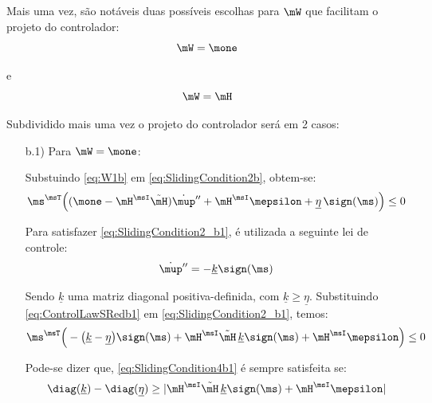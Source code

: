 \documentclass[]{politex}
\begin{document}
\begin{itemize}
Mais uma vez, são notáveis duas possíveis escolhas para $\mW$ que facilitam o projeto do controlador:
\begin{equation} \label{eq:W1b}
\mW = \mone
\end{equation}

e
\begin{equation} \label{eq:W2b}
\mW = \mH
\end{equation}

Subdividido mais uma vez o projeto do controlador será  em 2 casos:

\begin{itemize}
\item[b.1)] Para $\mW = \mone$:


Substuindo \eqref{eq:W1b} em \eqref{eq:SlidingCondition2b}, obtem-se:
\begin{equation} \label{eq:SlidingCondition2_b1}
\ms^\msT \Big((\mone - \mH^\msI \tilde{\mH} )\dot{\mup}'' + \mH^\msI \mepsilon + \underline{\eta} \, \sign(\ms) \Big) \leq 0
\end{equation}

Para satisfazer \eqref{eq:SlidingCondition2_b1}, é utilizada a seguinte lei de controle:
\begin{equation} \label{eq:ControlLawSRedb1}
\dot{\mup}'' =  -\underline{k} \sign(\ms)
\end{equation}

Sendo $\underline{k}$ uma matriz diagonal positiva-definida, com $\underline{k} \geq \underline{\eta} $. Substituindo \eqref{eq:ControlLawSRedb1} em \eqref{eq:SlidingCondition2_b1}, temos:
\begin{equation} \label{eq:SlidingCondition4b1}
\ms^\msT \Big(- \big(\underline{k} - \underline{\eta} \big)  \sign(\ms) + \mH^\msI \tilde{\mH} \, \underline{k} \sign(\ms) + \mH^\msI \mepsilon \Big) \leq 0
\end{equation}

Pode-se dizer que, \eqref{eq:SlidingCondition4b1} \'e sempre satisfeita se:
\begin{equation} \label{eq:DesigualdadeK1b1}
 \diag(\underline{k}) - \diag(\underline{\eta}) \geq  | \mH^\msI \tilde{\mH} \, \underline{k} \sign(\ms) + \mH^\msI \mepsilon |
\end{equation}


\end{itemize}
\end{itemize}
\end{document}
